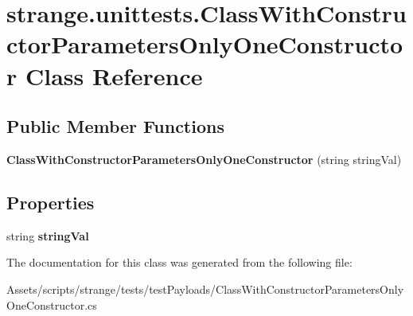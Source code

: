 \hypertarget{classstrange_1_1unittests_1_1_class_with_constructor_parameters_only_one_constructor}{\section{strange.\-unittests.\-Class\-With\-Constructor\-Parameters\-Only\-One\-Constructor Class Reference}
\label{classstrange_1_1unittests_1_1_class_with_constructor_parameters_only_one_constructor}
}
\subsection*{Public Member Functions}
\begin{DoxyCompactItemize}
\item 
\hypertarget{classstrange_1_1unittests_1_1_class_with_constructor_parameters_only_one_constructor_aa1daa23bf22830e81377ba522e7fb365}{{\bfseries Class\-With\-Constructor\-Parameters\-Only\-One\-Constructor} (string string\-Val)}\label{classstrange_1_1unittests_1_1_class_with_constructor_parameters_only_one_constructor_aa1daa23bf22830e81377ba522e7fb365}

\end{DoxyCompactItemize}
\subsection*{Properties}
\begin{DoxyCompactItemize}
\item 
\hypertarget{classstrange_1_1unittests_1_1_class_with_constructor_parameters_only_one_constructor_abe2026537d4f15845566d19d6caef428}{string {\bfseries string\-Val}}\label{classstrange_1_1unittests_1_1_class_with_constructor_parameters_only_one_constructor_abe2026537d4f15845566d19d6caef428}

\end{DoxyCompactItemize}


The documentation for this class was generated from the following file\-:\begin{DoxyCompactItemize}
\item 
Assets/scripts/strange/tests/test\-Payloads/Class\-With\-Constructor\-Parameters\-Only\-One\-Constructor.\-cs\end{DoxyCompactItemize}
